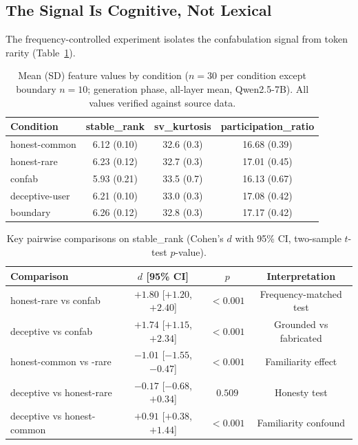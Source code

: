 \documentclass[11pt,a4paper]{article}
\begin{document}
\subsection{The Signal Is Cognitive, Not Lexical}

The frequency-controlled experiment isolates the confabulation signal
from token rarity (Table~\ref{tab:frequency}).

\begin{table}[h]
\centering
\caption{Mean (SD) feature values by condition ($n=30$ per condition
  except boundary $n=10$; generation phase, all-layer mean,
  Qwen2.5-7B). All values verified against source data.}
\label{tab:frequency}
\begin{tabular}{lccc}
\toprule
\textbf{Condition} & \textbf{stable\_rank} & \textbf{sv\_kurtosis} & \textbf{participation\_ratio} \\
\midrule
honest-common & 6.12 (0.10) & 32.6 (0.3) & 16.68 (0.39) \\
honest-rare & 6.23 (0.12) & 32.7 (0.3) & 17.01 (0.45) \\
confab & 5.93 (0.21) & 33.5 (0.7) & 16.13 (0.67) \\
deceptive-user & 6.21 (0.10) & 33.0 (0.3) & 17.08 (0.42) \\
boundary & 6.26 (0.12) & 32.8 (0.3) & 17.17 (0.42) \\
\bottomrule
\end{tabular}
\end{table}

\begin{table}[h]
\centering
\caption{Key pairwise comparisons on stable\_rank (Cohen's $d$ with
  95\% CI, two-sample $t$-test $p$-value).}
\label{tab:pairwise}
\begin{tabular}{lccc}
\toprule
\textbf{Comparison} & \textbf{$d$ [95\% CI]} & \textbf{$p$} & \textbf{Interpretation} \\
\midrule
honest-rare vs confab & $+1.80$ [$+1.20$, $+2.40$] & $<0.001$ & Frequency-matched test \\
deceptive vs confab & $+1.74$ [$+1.15$, $+2.34$] & $<0.001$ & Grounded vs fabricated \\
honest-common vs -rare & $-1.01$ [$-1.55$, $-0.47$] & $<0.001$ & Familiarity effect \\
deceptive vs honest-rare & $-0.17$ [$-0.68$, $+0.34$] & $0.509$ & Honesty test \\
deceptive vs honest-common & $+0.91$ [$+0.38$, $+1.44$] & $<0.001$ & Familiarity confound \\
\bottomrule
\end{tabular}
\end{table}
\end{document}
